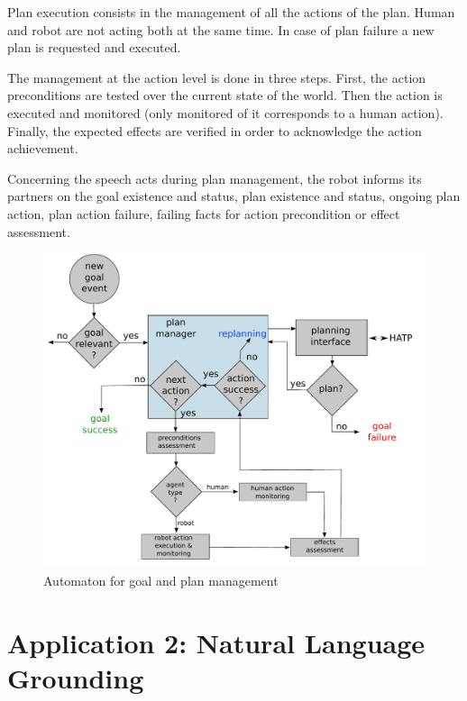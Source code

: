 \documentclass{svmult}
\begin{document}
Plan execution consists in the management of all the actions of the
plan. Human and robot are not acting both at the same time.  In case
of plan failure a new plan is requested and executed.

The management at the action level is done in three steps. First, the
action preconditions are tested over the current state of the
world. Then the action is executed and monitored (only monitored of it
corresponds to a human action).  Finally, the expected effects are
verified in order to acknowledge the action achievement.

Concerning the speech acts during plan management, the robot informs
its partners on the goal existence and status, plan existence and
status, ongoing plan action, plan action failure, failing facts for
action precondition or effect assessment.

\begin{figure}[thpb]
  \centering
  \includegraphics[width=0.8\columnwidth]{./figs/plan_management.pdf}
  \caption {Automaton for goal and plan management}
  \label{goal_plans_fg}
\end{figure}






\section{Application 2: Natural Language Grounding}
\label{dialog}
\end{document}
